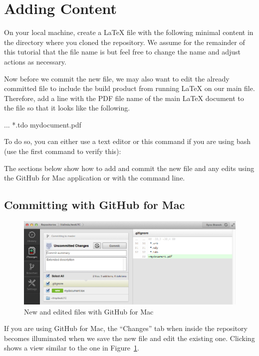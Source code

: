 \section{Adding Content}

On your local machine, create a LaTeX file with the following minimal content in the directory where you cloned the repository.  We assume for the remainder of this tutorial that the file name is  but feel free to change the name and adjust actions as necessary.

Now before we commit the new file, we may also want to edit the already committed  file to include the build product from running LaTeX on our main file.  Therefore, add a line with the PDF file name of the main LaTeX document to the file  so that it looks like the following.
\begin{FileVerbatim}
...
*.tdo
mydocument.pdf
\end{FileVerbatim}

To do so, you can either use a text editor or this command if you are using bash (use the first command to verify this):

The sections below show how to add and commit the new file and any edits using the GitHub for Mac application or with the command line.

\subsection{Committing with GitHub for Mac}

\begin{figure}
\centering
\includegraphics[scale=\myscale]{figures/github-mac-new-file}
\caption{New and edited files with GitHub for Mac} \label{fig:github-mac-new-file}
\end{figure}
If you are using GitHub for Mac, the ``Changes'' tab when inside the repository becomes illuminated when we save the new file and edit the existing one.  Clicking shows a view similar to the one in Figure~\ref{fig:github-mac-new-file}.  

